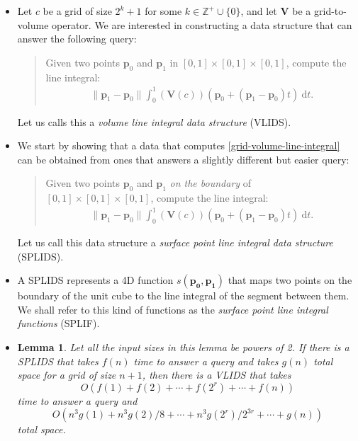 \documentclass[10pt]{article}
\newtheorem{lemma}{Lemma}[section]
\newcommand{\dee}{\mathrm{d}}
\newcommand{\V}{\mathbf{V}}
\begin{document}
\begin{itemize}
    \item Let $c$ be a grid of size $2^k+1$ for some $k \in \mathbb{Z}^+\cup \{0\}$, and 
    let $\V$ be a grid-to-volume operator.
    We are interested in constructing a data structure that
    can answer the following query:
    \begin{quote} 
        Given two points $\mathbf{p}_0$ and $\mathbf{p}_1$ in
	    $[0,1] \times [0,1] \times [0,1]$, compute the line
	    integral:
	    \begin{align} \label{grid-volume-line-integral}
	        \| \mathbf{p}_1 - \mathbf{p}_0 \| \int_0^1 
	        (\V(c))(\mathbf{p}_0 + (\mathbf{p}_1 - \mathbf{p}_0)t ) \ \dee t.
	    \end{align}
    \end{quote}
    
    Let us calls this a \emph{volume line integral data structure}
    (VLIDS).
    
    \item We start by showing that a data that computes
    \eqref{grid-volume-line-integral} can be obtained
    from ones that answers a slightly different but easier
    query:
    \begin{quote}
        Given two points $\mathbf{p}_0$ and $\mathbf{p}_1$
        \emph{on the boundary} of $[0,1] \times [0,1] \times [0,1]$,
        compute the line integral:
        \begin{align} \label{grid-surface-line-integral}
	        \| \mathbf{p}_1 - \mathbf{p}_0 \| \int_0^1 
	        (\V(c))(\mathbf{p}_0 + (\mathbf{p}_1 - \mathbf{p}_0)t ) \ \dee t.
	    \end{align}
    \end{quote}
    Let us call this data structure a \emph{surface point 
    line integral data structure} (SPLIDS).
    
    \item A SPLIDS represents a 4D function 
        $s(\mathbf{p_0}, \mathbf{p_1})$
        that maps two points on the boundary of the unit
        cube to the line integral of the segment between
        them. We shall refer to this kind of
        functions as the \emph{surface point line integral 
        functions} (SPLIF).
    
    \item \begin{lemma} \label{hierarchical-splids}
        Let all the input sizes in this lemma be powers of 2.
        If there is a SPLIDS that takes $f(n)$ time to answer 
        a query and takes $g(n)$ total space for 
        a grid of size $n+1$, then there is a VLIDS that 
        takes $$O(f(1) + f(2) + \dotsb + f(2^r) + \dotsb + f(n))$$ 
        time to answer a query and
        $$O(n^3g(1) + n^3g(2)/8 + \dotsb + n^3 g(2^r) / 2^{3r}
        + \dotsb + g(n))$$ total space.        
    \end{lemma}
    

\end{itemize}
\end{document}
